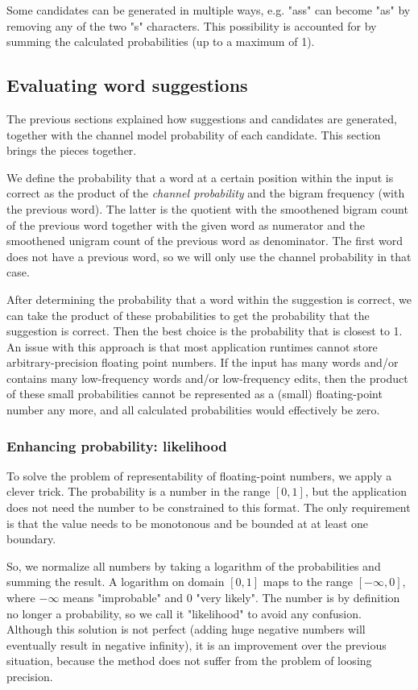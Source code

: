 \documentclass[11pt,a4paper]{article}
\begin{document}
Some candidates can be generated in multiple ways, e.g. "ass" can become "as" by removing any of the two "s" characters.
This possibility is accounted for by summing the calculated probabilities (up to a maximum of 1).

\subsection{Evaluating word suggestions}
The previous sections explained how suggestions and candidates are generated, together with the channel model probability of each candidate.
This section brings the pieces together.

We define the probability that a word at a certain position within the input is correct as the product of the \textit{channel probability} and the bigram frequency (with the previous word).
The latter is the quotient with the smoothened bigram count of the previous word together with the given word as numerator and the smoothened unigram count of the previous word as denominator.
The first word does not have a previous word, so we will only use the channel probability in that case.

After determining the probability that a word within the suggestion is correct, we can take the product of these probabilities to get the probability that the suggestion is correct. Then the best choice is the probability that is closest to 1.
An issue with this approach is that most application runtimes cannot store arbitrary-precision floating point numbers. If the input has many words and/or contains many low-frequency words and/or low-frequency edits, then the product of these small probabilities cannot be represented as a (small) floating-point number any more, and all calculated probabilities would effectively be zero.

\subsubsection{Enhancing probability: likelihood}
To solve the problem of representability of floating-point numbers, we apply a clever trick. The probability is a number in the range $[0,1]$, but the application does not need the number to be constrained to this format. The only requirement is that the value needs to be monotonous and be bounded at at least one boundary.

So, we normalize all numbers by taking a logarithm of the probabilities and summing the result. A logarithm on domain $[0,1]$ maps to the range $[-\infty, 0]$, where $-\infty$ means "improbable" and $0$ "very likely". The number is by definition no longer a probability, so we call it "likelihood" to avoid any confusion.\\
Although this solution is not perfect (adding huge negative numbers will eventually result in negative infinity), it is an improvement over the previous situation, because the method does not suffer from the problem of loosing precision.
\end{document}
